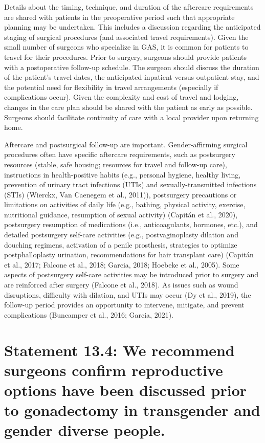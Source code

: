 \documentclass[
]{book}
\begin{document}
Details about the timing, technique, and duration of the aftercare requirements are shared with
patients in the preoperative period such that
appropriate planning may be undertaken. This
includes a discussion regarding the anticipated
staging of surgical procedures (and associated
travel requirements). Given the small number of
surgeons who specialize in GAS, it is common
for patients to travel for their procedures. Prior
to surgery, surgeons should provide patients with
a postoperative follow-up schedule. The surgeon
should discuss the duration of the patient's travel
dates, the anticipated inpatient versus outpatient
stay, and the potential need for flexibility in travel
arrangements (especially if complications occur).
Given the complexity and cost of travel and lodging, changes in the care plan should be shared
with the patient as early as possible. Surgeons
should facilitate continuity of care with a local
provider upon returning home.

Aftercare and postsurgical follow-up are
important. Gender-affirming surgical procedures
often have specific aftercare requirements, such
as postsurgery resources (stable, safe housing;
resources for travel and follow-up care), instructions in health-positive habits (e.g., personal
hygiene, healthy living, prevention of urinary
tract infections (UTIs) and sexually-transmitted
infections (STIs) (Wierckx, Van Caenegem et al.,
2011)), postsurgery precautions or limitations
on activities of daily life (e.g., bathing, physical
activity, exercise, nutritional guidance, resumption of sexual activity) (Capitán et al., 2020),
postsurgery resumption of medications (i.e.,
anticoagulants, hormones, etc.), and detailed
postsurgery self-care activities (e.g., postvaginoplasty dilation and douching regimens, activation of a penile prosthesis, strategies to optimize
postphalloplasty urination, recommendations for
hair transplant care) (Capitán et al., 2017;
Falcone et al., 2018; Garcia, 2018; Hoebeke
et al., 2005). Some aspects of postsurgery
self-care activities may be introduced prior to
surgery and are reinforced after surgery (Falcone
et al., 2018). As issues such as wound disruptions, difficulty with dilation, and UTIs may
occur (Dy et al., 2019), the follow-up period
provides an opportunity to intervene, mitigate,
and prevent complications (Buncamper et al.,
2016; Garcia, 2021).

\hypertarget{statement-13.4-we-recommend-surgeons-confirm-reproductive-options-have-been-discussed-prior-to-gonadectomy-in-transgender-and-gender-diverse-people.}{%
\section*{Statement 13.4: We recommend surgeons confirm reproductive options have been discussed prior to gonadectomy in transgender and gender diverse people.}\label{statement-13.4-we-recommend-surgeons-confirm-reproductive-options-have-been-discussed-prior-to-gonadectomy-in-transgender-and-gender-diverse-people.}}
\end{document}
